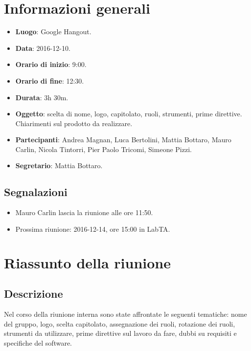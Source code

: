 \documentclass[a4paper,titlepage]{article}
\begin{document}
\maketitle
\begin{diario}
\end{diario}
\newpage
\tableofcontents

\newpage
\section{Informazioni generali}
\label{sec:Informazioni}

\begin{itemize}
  \item \textbf{Luogo}: Google Hangout.
  \item \textbf{Data}: 2016-12-10.
  \item \textbf{Orario di inizio}: 9:00.
  \item \textbf{Orario di fine}: 12:30.
  \item \textbf{Durata}: 3h 30m.
  \item \textbf{Oggetto}: scelta di nome, logo, capitolato, ruoli, strumenti, prime direttive. Chiarimenti sul prodotto da realizzare. 
  \item \textbf{Partecipanti}: Andrea Magnan, Luca Bertolini, Mattia Bottaro, Mauro Carlin, Nicola Tintorri, Pier Paolo Tricomi, Simeone Pizzi.
  \item \textbf{Segretario}: Mattia Bottaro.
  
\end{itemize}
\subsection{Segnalazioni}
\begin{itemize}
 \item Mauro Carlin lascia la riunione alle ore 11:50.
 \item Prossima riunione: 2016-12-14, ore 15:00 in LabTA. 
\end{itemize}
\section{Riassunto della riunione}
\label{sec:RiassuntoRiunione}
 \subsection{Descrizione}
 Nel corso della riunione interna sono state affrontate le seguenti tematiche: nome del gruppo, logo, scelta capitolato, assegnazione dei ruoli, rotazione dei ruoli, strumenti da utilizzare, prime direttive sul lavoro da fare, dubbi su requisiti e specifiche del software.
\end{document}

